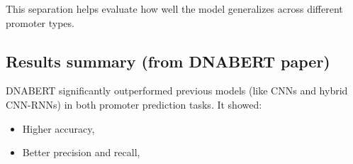 This separation helps evaluate how well the model generalizes across different promoter types.

\subsection{Results summary (from DNABERT paper)}

DNABERT significantly outperformed previous models (like CNNs and hybrid CNN-RNNs) in both promoter prediction tasks. It showed:
\begin{itemize}
\item Higher accuracy,
\item Better precision and recall,
\end{itemize}

